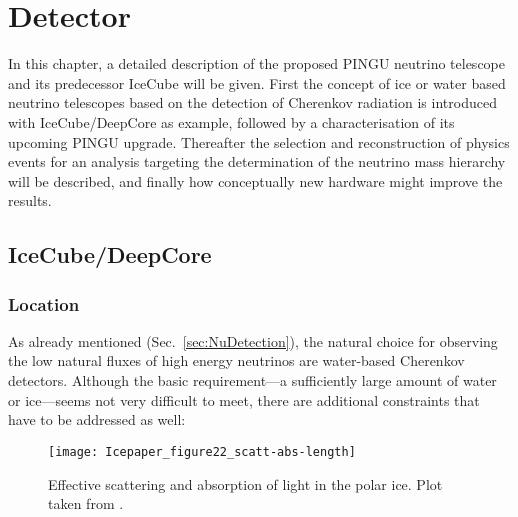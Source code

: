 \chapter{Detector}
\label{sec:det}

In this chapter, a detailed description of the proposed PINGU neutrino
telescope and its predecessor IceCube will be given. First the concept of ice or
water based neutrino telescopes based on the detection of Cherenkov radiation is
introduced with IceCube/DeepCore as example, followed by a characterisation of
its upcoming PINGU upgrade.
Thereafter the selection and reconstruction of physics events for an analysis
targeting the determination of the neutrino mass hierarchy will be described,
and finally how conceptually new hardware might improve the results.

\section{IceCube/DeepCore}
\label{sec:ICDC}

\subsection{Location}
\label{sec:IClocation}

As already mentioned (Sec.~\ref{sec:NuDetection}), the natural choice for
observing the low natural fluxes of high energy neutrinos are water-based
Cherenkov detectors. Although the basic requirement---a sufficiently large
amount of water or ice---seems not very difficult to meet, there are additional
constraints that have to be addressed as well:

\begin{figure}[thp]
 \centering
 \texttt{[image: Icepaper\_figure22\_scatt-abs-length]}
 \caption{Effective scattering and absorption of light in the polar ice. Plot
  taken from \cite{IceProps}.}
 \label{fig:ice_scatt_abs}
\end{figure}

